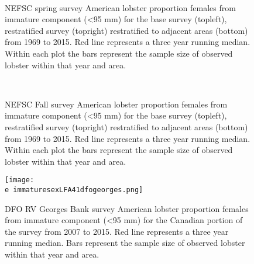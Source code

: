 \documentclass[11pt]{article}
\newcommand{\e}{/backup/bio_data/bio.lobster/figures/} %
\begin{document}
\begin{figure}
\centering
{}
\\
\caption{NEFSC spring survey American lobster proportion females from immature component (\textless 95 mm) for the base survey (topleft), restratified survey (topright) restratified to adjacent areas (bottom) from 1969 to 2015. Red line represents a three year running median. Within each plot the bars represent the sample size of observed lobster within that year and area. }
\end{figure}
\clearpage



\begin{figure}
\centering
{}
\\
\caption{NEFSC Fall survey American lobster proportion females from immature component (\textless 95 mm) for the base survey (topleft), restratified survey (topright) restratified to adjacent areas (bottom) from 1969 to 2015. Red line represents a three year running median. Within each plot the bars represent the sample size of observed lobster within that year and area. }
\end{figure}
\clearpage


\begin{figure}

    \texttt{[image: \\e immaturesexLFA41dfogeorges.png]}
    \caption{DFO RV Georges Bank survey American lobster proportion females from immature component (\textless 95 mm) for the Canadian portion of the survey from 2007 to 2015. Red line represents a three year running median. Bars represent the sample size of observed lobster within that year and area.}

\end{figure}




\end{document}
